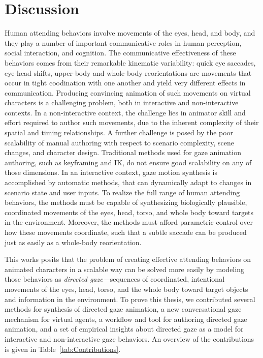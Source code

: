 \pagestyle{deposit}

\chapter{Discussion}
\label{cha:Discussion}

Human attending behaviors involve movements of the eyes, head, and body, and they play a number of important communicative roles in human perception, social interaction, and cognition. The communicative effectiveness of these behaviors comes from their remarkable kinematic variability: quick eye saccades, eye-head shifts, upper-body and whole-body reorientations are movements that occur in tight coodination with one another and yield very different effects in communication. Producing convincing animation of such movements on virtual characters is a challenging problem, both in interactive and non-interactive contexts. In a non-interactive context, the challenge lies in animator skill and effort required to author such movements, due to the inherent complexity of their spatial and timing relationships. A further challenge is posed by the poor scalability of manual authoring with respect to scenario complexity, scene changes, and character design. Traditional methods used for gaze animation authoring, such as keyframing and IK, do not ensure good scalability on any of those dimensions. In an interactive context, gaze motion synthesis is accomplished by automatic methods, that can dynamically adapt to changes in scenario state and user inputs. To realize the full range of human attending behaviors, the methods must be capable of synthesizing biologically plausible, coordinated movements of the eyes, head, torso, and whole body toward targets in the environment. Moreover, the methods must afford parametric control over how these movements coordinate, such that a subtle saccade can be produced just as easily as a whole-body reorientation.

This works posits that the problem of creating effective attending behaviors on animated characters in a scalable way can be solved more easily by modeling those behaviors as \emph{directed gaze}---sequences of coordinated, intentional movements of the eyes, head, torso, and the whole body toward target objects and information in the environment. To prove this thesis, we contributed several methods for synthesis of directed gaze animation, a new conversational gaze mechanism for virtual agents, a workflow and tool for authoring directed gaze animation, and a set of empirical insights about directed gaze as a model for interactive and non-interactive gaze behaviors. An overview of the contributions is given in Table~\ref{tab:Contributions}.

